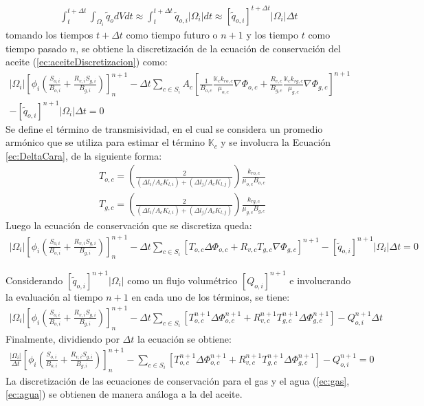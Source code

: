 \begin{appendix}
\begin{align*}
	\int_{t}^{t+\Delta t}\int_{\Omega_{i}}\tilde{q}_{o}dVdt \approx \int_{t}^{t+\Delta t}\tilde{q}_{o,i} |\Omega_{i}|dt
	\approx \left[\tilde{q}_{o,i}\right]^{t+\Delta t} |\Omega_{i}|\Delta t
\end{align*}
tomando los tiempos $t+\Delta t$ como tiempo futuro o $n+1$ y los tiempo $t$ como tiempo pasado $n$, se obtiene la discretización de la ecuación de conservación del aceite (\ref{ec:aceiteDiscretizacion}) como:
\begin{align*}
	|\Omega_{i}|\left[ \phi_{i} \left( \frac{S_{o,i}}{B_{o,i}} + \frac{R_{v,i} S_{g,i}}{B_{g,i}} \right) \right]^{n+1}_{n} - \Delta t \sum_{c \in S_{i}} A_{c} \left[ \frac{1}{B_{o,c}} \frac{\mathbb{K}_{c}k_{ro,c}}{\mu_{o,c}} \nabla \Phi_{o,c} + \frac{R_{v,c}}{B_{g,c}} \frac{\mathbb{K}_{c}k_{rg,c}}{\mu_{g,c}} \nabla \Phi_{g,c} \right]^{n+1} \\- \left[\tilde{q}_{o,i}\right]^{n+1} |\Omega_{i}|\Delta t = 0
\end{align*}
Se define el término de transmisividad, en el cual se considera un promedio armónico que se utiliza para estimar el término $\mathbb{K}_{c}$ y se involucra la Ecuación \ref{ec:DeltaCara}, de la siguiente forma:
\begin{align*}
	&T_{o,c} = \left(\frac{2}{(\Delta l_{i}/A_{c}K_{l,i})+(\Delta l_{j}/A_{c}K_{l,j})}\right)\frac{k_{ro,c}}{\mu_{o,c}B_{o,c}}\\
	&T_{g,c} = \left(\frac{2}{(\Delta l_{i}/A_{c}K_{l,i})+(\Delta l_{j}/A_{c}K_{l,j})}\right)\frac{k_{rg,c}}{\mu_{g,c}B_{g,c}}
\end{align*}
Luego la ecuación de conservación que se discretiza queda:
\begin{align*}
|\Omega_{i}|\left[ \phi_{i} \left( \frac{S_{o,i}}{B_{o,i}} + \frac{R_{v,i} S_{g,i}}{B_{g,i}} \right) \right]^{n+1}_{n} - \Delta t \sum_{c \in S_{i}} \left[ T_{o,c} \Delta \Phi_{o,c} + R_{v,c} T_{g,c} \nabla \Phi_{g,c} \right]^{n+1} - \left[\tilde{q}_{o,i}\right]^{n+1} |\Omega_{i}|\Delta t = 0
\end{align*}

Considerando $\left[\tilde{q}_{o,i}\right]^{n+1} |\Omega_{i}|$ como un flujo volumétrico $\left[Q_{o,i}\right]^{n+1}$ e involucrando la evaluación al tiempo $n+1$ en cada uno de los términos, se tiene:
\begin{align*}
|\Omega_{i}|\left[ \phi_{i} \left( \frac{S_{o,i}}{B_{o,i}} + \frac{R_{v,i} S_{g,i}}{B_{g,i}} \right) \right]^{n+1}_{n} - \Delta t \sum_{c \in S_{i}} \left[ T_{o,c}^{n+1} \Delta \Phi_{o,c}^{n+1} + R_{v,c}^{n+1} T_{g,c}^{n+1} \Delta \Phi_{g,c}^{n+1} \right] - Q_{o,i}^{n+1} \Delta t
\end{align*}
Finalmente, dividiendo por $\Delta t$ la ecuación se obtiene:
\begin{align*}
\frac{|\Omega_{i}|}{\Delta t}\left[ \phi_{i} \left( \frac{S_{o,i}}{B_{o,i}} + \frac{R_{v,i} S_{g,i}}{B_{g,i}} \right) \right]^{n+1}_{n} - \sum_{c \in S_{i}} \left[ T_{o,c}^{n+1} \Delta \Phi_{o,c}^{n+1} + R_{v,c}^{n+1} T_{g,c}^{n+1} \Delta \Phi_{g,c}^{n+1} \right] - Q_{o,i}^{n+1} = 0
\end{align*}
La discretización de las ecuaciones de conservación para el gas y el agua (\ref{ec:gas}, \ref{ec:agua}) se obtienen de manera análoga a la del aceite.

\end{appendix}
